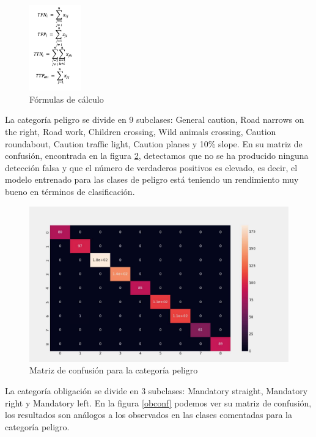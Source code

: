 \begin{figure}[H]
    \centering
 	\includegraphics[width=0.2\textwidth]{Imagenes/IA/formulas_confusion.pdf}
    \caption{Fórmulas de cálculo}
    \label{forconf}
\end{figure}

La categoría peligro se divide en 9 subclases: General caution, Road narrows on the right, Road work, Children crossing, Wild animals crossing, Caution roundabout, Caution traffic light, Caution planes y 10\% slope. En su matriz de confusión, encontrada en la figura \ref{pelconf}, detectamos que no se ha producido ninguna detección falsa y que el número de verdaderos positivos es elevado, es decir, el modelo entrenado para las clases de peligro está teniendo un rendimiento muy bueno en términos de clasificación.\\

\begin{figure}[H]
    \centering
 	\includegraphics[width=\textwidth]{Imagenes/IA/peligro_confusion.pdf}
    \caption{Matriz de confusión para la categoría peligro}
    \label{pelconf}
\end{figure}

La categoría obligación se divide en 3 subclases: Mandatory straight, Mandatory right y Mandatory left. En la figura \ref{obconf} podemos ver su matriz de confusión, los resultados son análogos a los observados en las clases comentadas para la categoría peligro.\\

